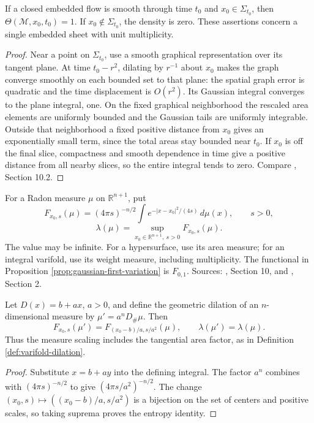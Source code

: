 \begin{proposition}\label{prop:mcf-regular-density}
If a closed embedded flow is smooth through time $t_0$ and $x_0\in\Sigma_{t_0}$, then $\Theta(\mathcal M,x_0,t_0)=1$. If $x_0\notin\Sigma_{t_0}$, the density is zero. These assertions concern a single embedded sheet with unit multiplicity.
\end{proposition}
\begin{proof}
Near a point on $\Sigma_{t_0}$, use a smooth graphical representation over its tangent plane. At time $t_0-r^2$, dilating by $r^{-1}$ about $x_0$ makes the graph converge smoothly on each bounded set to that plane: the spatial graph error is quadratic and the time displacement is $O(r^2)$. Its Gaussian integral converges to the plane integral, one. On the fixed graphical neighborhood the rescaled area elements are uniformly bounded and the Gaussian tails are uniformly integrable. Outside that neighborhood a fixed positive distance from $x_0$ gives an exponentially small term, since the total areas stay bounded near $t_0$. If $x_0$ is off the final slice, compactness and smooth dependence in time give a positive distance from all nearby slices, so the entire integral tends to zero. Compare \cite{WhiMCF15}, Section 10.2.
\end{proof}

\begin{definition}\label{def:mcf-entropy}
For a Radon measure $\mu$ on $\mathbb R^{n+1}$, put
\[
 F_{x_0,s}(\mu)=(4\pi s)^{-n/2}\int e^{-|x-x_0|^2/(4s)}\,d\mu(x),
 \qquad s>0,
\]
\[
 \lambda(\mu)=\sup_{x_0\in\mathbb R^{n+1},\ s>0}F_{x_0,s}(\mu).
\]
The value may be infinite. For a hypersurface, use its area measure; for an integral varifold, use its weight measure, including multiplicity. The functional in Proposition \ref{prop:gaussian-first-variation} is $F_{0,1}$. Sources: \cite{WhiMCF15}, Section 10, and \cite{CCMS20}, Section 2.
\end{definition}

\begin{proposition}\label{prop:mcf-entropy-invariance}
Let $D(x)=b+ax$, $a>0$, and define the geometric dilation of an $n$-dimensional measure by $\mu'=a^nD_\#\mu$. Then
\[
 F_{x_0,s}(\mu')=F_{(x_0-b)/a,s/a^2}(\mu),
 \qquad \lambda(\mu')=\lambda(\mu).
\]
Thus the measure scaling includes the tangential area factor, as in Definition \ref{def:varifold-dilation}.
\end{proposition}
\begin{proof}
Substitute $x=b+ay$ into the defining integral. The factor $a^n$ combines with $(4\pi s)^{-n/2}$ to give $(4\pi s/a^2)^{-n/2}$. The change $(x_0,s)\mapsto((x_0-b)/a,s/a^2)$ is a bijection on the set of centers and positive scales, so taking suprema proves the entropy identity.
\end{proof}

